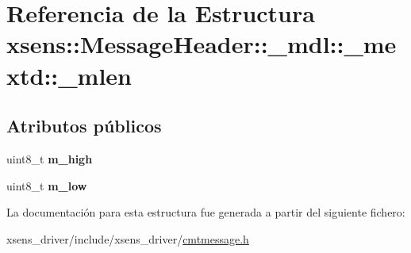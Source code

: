 \hypertarget{structxsens_1_1MessageHeader_1_1__mdl_1_1__mextd_1_1__mlen}{\section{\-Referencia de la \-Estructura xsens\-:\-:\-Message\-Header\-:\-:\-\_\-mdl\-:\-:\-\_\-mextd\-:\-:\-\_\-mlen}
\label{structxsens_1_1MessageHeader_1_1__mdl_1_1__mextd_1_1__mlen}
}
\subsection*{\-Atributos públicos}
\begin{DoxyCompactItemize}
\item 
\hypertarget{structxsens_1_1MessageHeader_1_1__mdl_1_1__mextd_1_1__mlen_a0ee9a5cd466e7a96eb8ca60eee912579}{uint8\-\_\-t {\bfseries m\-\_\-high}}\label{structxsens_1_1MessageHeader_1_1__mdl_1_1__mextd_1_1__mlen_a0ee9a5cd466e7a96eb8ca60eee912579}

\item 
\hypertarget{structxsens_1_1MessageHeader_1_1__mdl_1_1__mextd_1_1__mlen_ad6a8f2ced03454391f7926d9ddaa3f44}{uint8\-\_\-t {\bfseries m\-\_\-low}}\label{structxsens_1_1MessageHeader_1_1__mdl_1_1__mextd_1_1__mlen_ad6a8f2ced03454391f7926d9ddaa3f44}

\end{DoxyCompactItemize}


\-La documentación para esta estructura fue generada a partir del siguiente fichero\-:\begin{DoxyCompactItemize}
\item 
xsens\-\_\-driver/include/xsens\-\_\-driver/\hyperlink{cmtmessage_8h}{cmtmessage.\-h}\end{DoxyCompactItemize}
